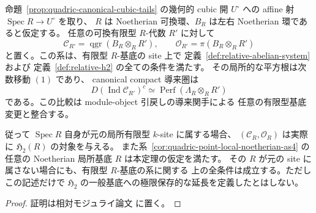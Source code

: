 \begin{theorem}
\label{thm:quadric-noetherian-relative-promotion}
命題~\ref{prop:quadric-canonical-cubic-tails} の幾何的 cubic 開
$U^\circ$ への affine 射 $\operatorname{Spec}R\to U^\circ$ を取り、
$R$ は Noetherian 可換環、$B_R$ は左右 Noetherian 環であると仮定する。
任意の可換有限型 $R$-代数 $R'$ に対して
\[
 \mathcal C_{R'}=\operatorname{qgr}(B_R\otimes_RR'),
 \qquad\mathcal O_{R'}=\pi(B_R\otimes_RR')
\]
と置く。この系は、有限型 $R$-基底の site 上で
定義~\ref{def:relative-abelian-system} および
定義~\ref{def:relative-h2} の全ての条件を満たす。
その局所的な平方根は次数移動 $(1)$ であり、
canonical compact 導来圏は
\[
 D(\operatorname{Ind}\mathcal C_{R'})^c
     \simeq\operatorname{Perf}(\Lambda_R\otimes_RR')
\]
である。この比較は module-object 引戻しの導来関手による
任意の有限型基底変更と整合する。

従って $\operatorname{Spec}R$ 自身が元の局所有限型 $k$-site に属する場合、
$(\mathcal C_R,\mathcal O_R)$ は実際に
$\mathfrak H_2(R)$ の対象を与える。
また系~\ref{cor:quadric-point-local-noetherian-as4} の任意の
Noetherian 局所基底 $R$ は本定理の仮定を満たす。
その $R$ が元の site に属さない場合にも、有限型 $R$-基底の系に関する
上の全条件は成立する。ただしこの記述だけで
$\mathfrak H_2$ の一般基底への極限保存的な延長を定義したとはしない。
\end{theorem}
\begin{proof}
証明は相対モジュライ論文 \cite[\texttt{relative_cubic_tails}]{QuadricModuli2026} に置く。
\end{proof}
